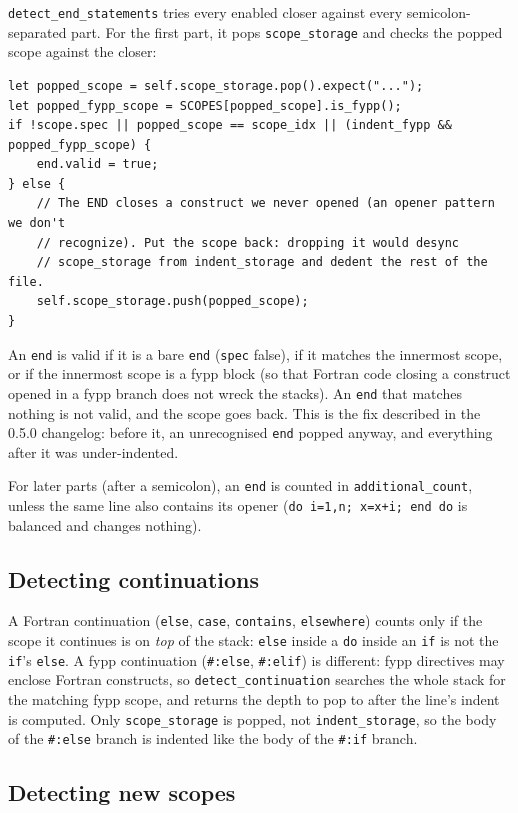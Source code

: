 \documentclass[11pt,a4paper,openany]{book}
\newcommand{\code}[1]{\texttt{\small #1}}
\begin{document}
\code{detect\_end\_statements} tries every enabled closer against every
semicolon-separated part. For the first part, it pops \code{scope\_storage}
and checks the popped scope against the closer:

\begin{lstlisting}[style=rust]
let popped_scope = self.scope_storage.pop().expect("...");
let popped_fypp_scope = SCOPES[popped_scope].is_fypp();
if !scope.spec || popped_scope == scope_idx || (indent_fypp && popped_fypp_scope) {
    end.valid = true;
} else {
    // The END closes a construct we never opened (an opener pattern we don't
    // recognize). Put the scope back: dropping it would desync
    // scope_storage from indent_storage and dedent the rest of the file.
    self.scope_storage.push(popped_scope);
}
\end{lstlisting}

An \code{end} is valid if it is a bare \code{end} (\code{spec} false), if it
matches the innermost scope, or if the innermost scope is a fypp block (so that
Fortran code closing a construct opened in a fypp branch does not wreck the
stacks). An \code{end} that matches nothing is not valid, and the scope goes
back. This is the fix described in the 0.5.0 changelog: before it, an
unrecognised \code{end} popped anyway, and everything after it was
under-indented.

For later parts (after a semicolon), an \code{end} is counted in
\code{additional\_count}, unless the same line also contains its opener
(\code{do i=1,n; x=x+i; end do} is balanced and changes nothing).

\subsection{Detecting continuations}

A Fortran continuation (\code{else}, \code{case}, \code{contains},
\code{elsewhere}) counts only if the scope it continues is on \emph{top} of the
stack: \code{else} inside a \code{do} inside an \code{if} is not the
\code{if}'s \code{else}. A fypp continuation (\code{\#:else}, \code{\#:elif}) is
different: fypp directives may enclose Fortran constructs, so
\code{detect\_continuation} searches the whole stack for the matching fypp
scope, and returns the depth to pop to after the line's indent is computed.
Only \code{scope\_storage} is popped, not \code{indent\_storage}, so the body
of the \code{\#:else} branch is indented like the body of the \code{\#:if}
branch.

\subsection{Detecting new scopes}
\end{document}
